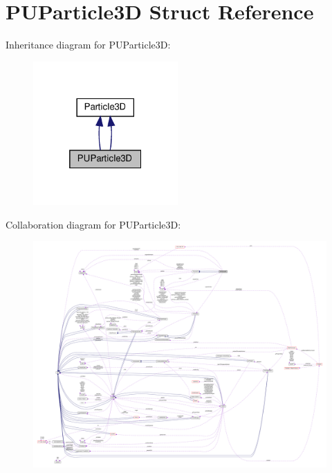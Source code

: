 \hypertarget{structPUParticle3D}{}\section{P\+U\+Particle3D Struct Reference}
\label{structPUParticle3D}


Inheritance diagram for P\+U\+Particle3D\+:
\nopagebreak
\begin{figure}[H]
\begin{center}
\leavevmode
\includegraphics[width=157pt]{structPUParticle3D__inherit__graph}
\end{center}
\end{figure}


Collaboration diagram for P\+U\+Particle3D\+:
\nopagebreak
\begin{figure}[H]
\begin{center}
\leavevmode
\includegraphics[width=350pt]{structPUParticle3D__coll__graph}
\end{center}
\end{figure}
